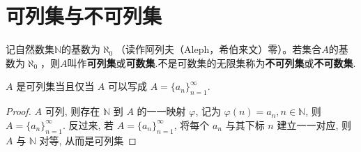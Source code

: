\documentclass[../../main.tex]{subfiles}%
\begin{document}
\section{可列集与不可列集}

\begin{definition}
记自然数集\(\mathbb{N}\)的基数为\(\aleph_0\)（读作阿列夫（Aleph，希伯来文）零）。若集合\(A\)的基数为\(\aleph_0\)，则\(A\)叫作\textbf{可列集}或\textbf{可数集}.不是可数集的无限集称为\textbf{不可列集}或\textbf{不可数集}.
\end{definition}

\begin{proposition}\label{proposition:可列集的表示方式}
$A$ 是可列集当且仅当 $A$ 可以写成 $A = \{a_n\}_{n = 1}^{\infty}$.
\end{proposition}
\begin{proof}

$A$ 可列, 则存在 $\mathbb{N}$ 到 $A$ 的一一映射 $\varphi$, 记为 $\varphi(n) = a_n, n \in \mathbb{N}$, 则 $A = \{a_n\}_{n = 1}^{\infty}$. 反过来, 若 $A = \{a_n\}_{n = 1}^{\infty}$, 将每个 $a_n$ 与其下标 $n$ 建立一一对应, 则 $A$ 与 $\mathbb{N}$ 对等, 从而是可列集

\end{proof}
\end{document}
